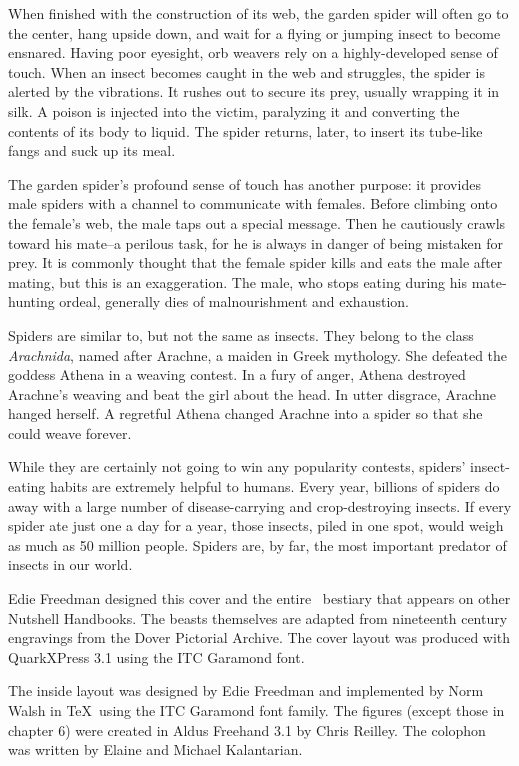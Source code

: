 When finished with the construction of its web, the garden spider will often
go to the center, hang upside down, and wait for a flying or jumping insect
to become ensnared. Having poor eyesight, orb weavers rely on a
highly-developed sense of touch. When an insect becomes caught in the web
and struggles, the spider is alerted by the vibrations. It rushes out
to secure its prey, usually wrapping it in silk. A poison is injected
into the 
\linebreak
\newpage
victim, paralyzing it and converting the contents of its body
to liquid. The spider returns, later, to insert its tube-like fangs
and suck up its meal.

The garden spider's profound sense of touch has another purpose: it provides
male spiders with a channel to communicate with females. Before climbing onto
the female's web, the male taps out a special message. Then he cautiously
crawls toward his mate--a perilous task, for he is always in danger of being
mistaken for prey. It is commonly thought that the female spider kills
and eats the male after mating, but this is an exaggeration. The male,
who stops eating during his mate-hunting ordeal, generally dies of
malnourishment and exhaustion.

Spiders are similar to, but not the same as insects. They belong to
the class \textit{Arachnida}, named after Arachne, a maiden in Greek mythology.
She defeated the goddess Athena in a weaving contest. In a fury of anger,
Athena destroyed Arachne's weaving and beat the girl about the head.
In utter disgrace, Arachne hanged herself. A regretful Athena changed
Arachne into a spider so that she could weave forever.

While they are certainly not going to win any popularity contests, spiders'
insect-eating habits are extremely helpful to humans. Every year, billions of
spiders do away with a large number of disease-carrying and crop-destroying
insects. If every spider ate just one a day for a year, those insects,
piled in one spot, would weigh as much as 50 million people. Spiders are,
by far, the most important predator of insects in our world.

Edie Freedman designed this cover and the entire \Unix\ bestiary that
appears on other Nutshell Handbooks. The beasts themselves are adapted
from nineteenth century engravings from the Dover Pictorial Archive.
The cover layout was produced with QuarkXPress 3.1 using the
ITC Garamond font.

The inside layout was designed by Edie Freedman and implemented
by Norm Walsh in \TeX\ using the ITC Garamond font family.
The figures (except those in chapter 6) were created in Aldus Freehand 3.1
by Chris Reilley. The colophon was written by Elaine and Michael Kalantarian.

